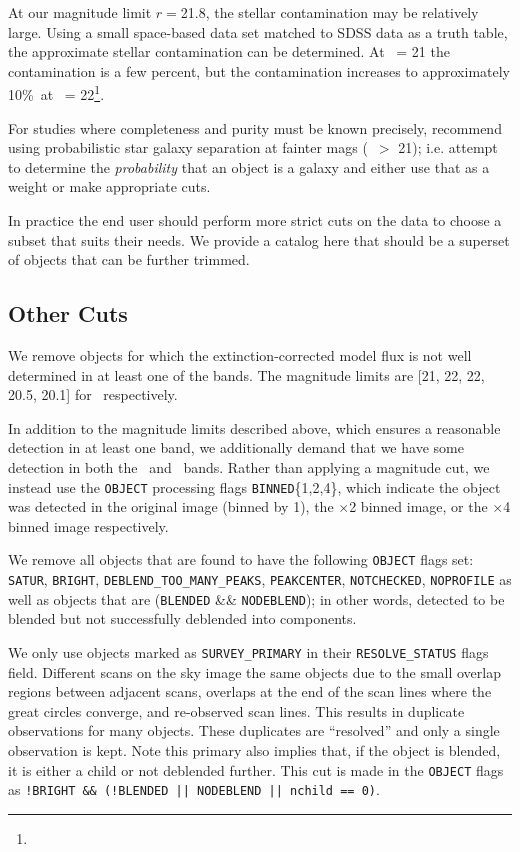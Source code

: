 \documentclass[preprint]{aastex}
\newcommand{\rmax}{21.8}
\newcommand{\contamworst}{10\%}
\begin{document}
At our magnitude limit $r = $\rmax, the stellar contamination may be relatively
large.  Using a small space-based data set matched to SDSS data as a truth
table, the approximate stellar contamination can be determined.  At \rmag\ = 21
the contamination is a few percent, but the contamination increases to
approximately \contamworst\ at \rmag\ = 22\footnote{\DRsevsg}.  

For studies where completeness and purity must be known precisely,
\citet{ScrantonMag05} recommend using probabilistic star galaxy separation at
fainter mags (\rmag\ $ > $ 21); i.e.  attempt to determine the {\it
probability} that an object is a galaxy and either use that as a weight or make
appropriate cuts. 


In practice the end user should perform more strict cuts on the data to choose
a subset that suits their needs.  We provide a catalog here that should be a
superset of objects that can be further trimmed.

\subsection{Other Cuts}

We remove objects for which the extinction-corrected model flux is not well
determined in at least one of the bands.  The magnitude limits are [21, 22, 22,
20.5, 20.1] for \allmag\ respectively.

In addition to the magnitude limits described above, which ensures a reasonable
detection in at least one band, we additionally demand that we have some
detection in both the \rmag\ and \imag\ bands.  Rather than applying a
magnitude cut, we instead use the \texttt{OBJECT} processing flags
\texttt{BINNED}\{1,2,4\}, which indicate the object was detected in the
original image (binned by 1), the $\times$2 binned image, or the $\times$4
binned image respectively.

We remove all objects that are found to have the following \texttt{OBJECT}
flags set: \texttt{SATUR}, \texttt{BRIGHT}, \texttt{DEBLEND\_TOO\_MANY\_PEAKS},
\texttt{PEAKCENTER}, \texttt{NOTCHECKED}, \texttt{NOPROFILE} as well as objects
that are (\texttt{BLENDED} \&\& \texttt{NODEBLEND}); in other words, detected
to be blended but not successfully deblended into components. 

We only use objects marked as \texttt{SURVEY\_PRIMARY} in their
\texttt{RESOLVE\_STATUS} flags field. Different scans on the sky image the same
objects due to the small overlap regions between adjacent scans, overlaps at
the end of the scan lines where the great circles converge, and re-observed
scan lines.  This results in duplicate observations for many objects.  These
duplicates are ``resolved'' and only a single observation is kept.  Note this
primary also implies that, if the object is blended, it is either a child or
not deblended further.  This cut is made in the \texttt{OBJECT} flags as
\texttt{!BRIGHT \&\& (!BLENDED || NODEBLEND || nchild == 0)}.
\end{document}
